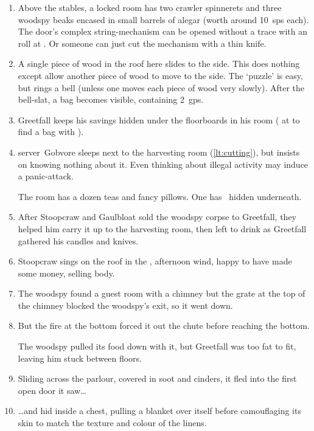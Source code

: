 \documentclass[10pt,twoside]{book}
\begin{document}
\begin{enumerate}\itemsep0em
  \item
  Above the stables, a locked room has two \gls{crawler} spinnerets and three \gls{woodspy} beaks encased in small barrels of alegar (worth around 10~\glspl{sp} each).
  The door's complex string-mechanism can be opened without a trace with an  roll at \tn[9].
  Or someone can just cut the mechanism with a thin knife.
  \label{lt:ingStore}
  \item
  A single piece of wood in the roof here slides to the side.
  This does nothing except allow another piece of wood to move to the side.
  The `puzzle' is easy, but rings a bell (unless one moves each piece of wood very slowly).
  After the bell-slat, a bag becomes visible, containing 2~\glspl{gp}.
  \label{lt:stash}
  \item
  Greetfall keeps his savings hidden under the floorboards in his room ( at \tn[10] to find a bag with \lootBig).
  \label{lt:tenderRoom}
  \item
  \Gls{server}~Gobvore sleeps next to the \gls{harvesting} room (\vref{lt:cutting}), but insists on knowing nothing about it.
  \label{lt:server}
  Even thinking about illegal activity may induce a panic-attack.

  The room has a dozen teas and fancy pillows.
  One has \lootMedium\ hidden underneath.
  \item
  \label{lt:cutting}
  After Stoopcraw and Gaulbloat sold the \gls{woodspy} corpse to Greetfall, they helped him carry it up to the \gls{harvesting} room, then left to drink as Greetfall gathered his candles and knives.
  \setcounter{diceNo}{\value{enumi}}
  \item
  Stoopcraw sings on the roof in the \showTemperature, afternoon wind, happy to have made some money, selling  body.
  \label{lt:singer}
  \item
  The \gls{woodspy} found a guest room with a chimney but the grate at the top of the chimney blocked the \gls{woodspy}'s exit, so it went down.
  \label{lt:guestFire}
  \item
  But the fire at the bottom forced it out the chute before reaching the bottom.

  The \gls{woodspy} pulled its food down with it, but Greetfall was too fat to fit, leaving him stuck between floors.
  \label{lt:chimney}
  \item
  Sliding across the parlour, covered in soot and cinders, it fled into the first open door it saw\ldots
  \label{lt:parlour}
  \item
  \ldots and hid inside a chest, pulling a blanket over itself before camouflaging its skin to match the texture and colour of the linens.
  \label{lt:woodspy}
  \setcounter{diceNo}{\value{enumi}}
\end{enumerate}
\end{document}
